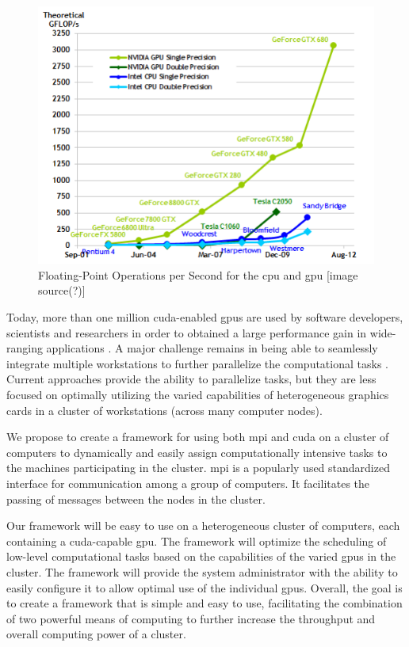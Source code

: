 \begin{figure}[htb]
\centering
\includegraphics[scale=0.75]{img/floatingPoint.png}
\caption{Floating-Point Operations per Second for the \gls{cpu} and
         \gls{gpu} [image source(?)]}
\end{figure}

Today, more than one million \gls{cuda}-enabled \glspl{gpu} are used by
software developers, scientists and researchers in order to obtained a large
performance gain in wide-ranging applications
\cite{website:CUDA-Toolkit-Documentation}. A major challenge remains in being
able to seamlessly integrate multiple workstations to further parallelize the
computational tasks \cite{hadri2010identifying} \cite{hindman2009common}.
Current approaches provide the ability to parallelize tasks, but they are less
focused on optimally utilizing the varied capabilities of heterogeneous
graphics cards in a cluster of workstations (across many computer nodes).

We propose to create a framework for using both \Gls{mpi} and \gls{cuda} on a
cluster of computers to dynamically and easily assign computationally intensive
tasks to the machines participating in the cluster.  \Gls{mpi} is a popularly
used standardized interface for communication among a group of computers. It
facilitates the passing of messages between the nodes in the cluster.

Our framework will be easy to use on a heterogeneous cluster of computers, each
containing a \Gls{cuda}-capable \gls{gpu}\@. The framework will optimize the
scheduling of low-level computational tasks based on the capabilities of the
varied \glspl{gpu} in the cluster. The framework will provide the system
administrator with the ability to easily configure it to allow optimal use of
the individual \glspl{gpu}. Overall, the goal is to create a framework that is
simple and easy to use, facilitating the combination of two powerful means of
computing to further increase the throughput and overall computing power of a
cluster.

